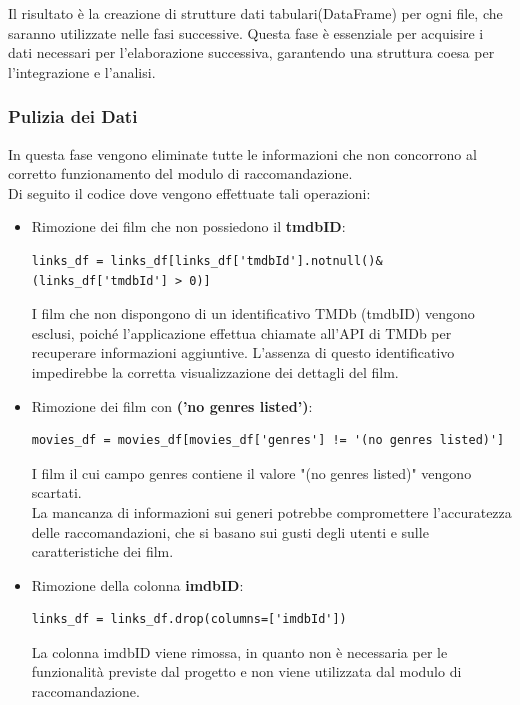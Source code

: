 \documentclass[a4paper,12pt]{article}
\begin{document}
	Il risultato è la creazione di strutture dati tabulari(DataFrame) per ogni file, che saranno utilizzate nelle fasi successive. 
	Questa fase è essenziale per acquisire i dati necessari per l'elaborazione successiva, garantendo una struttura coesa per l'integrazione e l'analisi.
	\subsubsection{Pulizia dei Dati}
	In questa fase vengono eliminate tutte le informazioni che non concorrono al corretto funzionamento del modulo di raccomandazione.\\
	Di seguito il codice dove vengono effettuate tali operazioni:
	\begin{itemize}
		\item{Rimozione dei film che non possiedono il \textbf{tmdbID}: }
\begin{verbatim}
links_df = links_df[links_df['tmdbId'].notnull()&(links_df['tmdbId'] > 0)] 
\end{verbatim}
I film che non dispongono di un identificativo TMDb (tmdbID) vengono esclusi, poiché l'applicazione effettua chiamate all'API di TMDb per recuperare informazioni aggiuntive. L'assenza di questo identificativo impedirebbe la corretta visualizzazione dei dettagli del film.
		\item{Rimozione dei film con \textbf{('no genres listed')}:}
\begin{verbatim}
movies_df = movies_df[movies_df['genres'] != '(no genres listed)']
\end{verbatim}
I film il cui campo genres contiene il valore "(no genres listed)" vengono scartati.\\La mancanza di informazioni sui generi potrebbe compromettere l'accuratezza delle raccomandazioni, che si basano sui gusti degli utenti e sulle caratteristiche dei film.
		\item{Rimozione della colonna \textbf{imdbID}:}
\begin{verbatim}
links_df = links_df.drop(columns=['imdbId'])
\end{verbatim}
La colonna imdbID viene rimossa, in quanto non è necessaria per le funzionalità previste dal progetto e non viene utilizzata dal modulo di raccomandazione.

\end{itemize}
\end{document}
